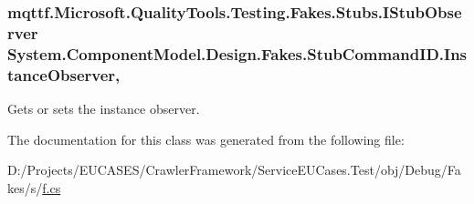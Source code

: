 \hypertarget{class_system_1_1_component_model_1_1_design_1_1_fakes_1_1_stub_command_i_d_a6e2d8a85d00f40118dc981f0029d33fb}{
\subsubsection[{Instance\-Observer}]{\setlength{\rightskip}{0pt plus 5cm}mqttf.\-Microsoft.\-Quality\-Tools.\-Testing.\-Fakes.\-Stubs.\-I\-Stub\-Observer System.\-Component\-Model.\-Design.\-Fakes.\-Stub\-Command\-I\-D.\-Instance\-Observer\hspace{0.3cm}{\ttfamily [get]}, {\ttfamily [set]}}}\label{class_system_1_1_component_model_1_1_design_1_1_fakes_1_1_stub_command_i_d_a6e2d8a85d00f40118dc981f0029d33fb}


Gets or sets the instance observer.



The documentation for this class was generated from the following file\-:\begin{DoxyCompactItemize}
\item 
D\-:/\-Projects/\-E\-U\-C\-A\-S\-E\-S/\-Crawler\-Framework/\-Service\-E\-U\-Cases.\-Test/obj/\-Debug/\-Fakes/s/\hyperlink{s_2f_8cs}{f.\-cs}\end{DoxyCompactItemize}
